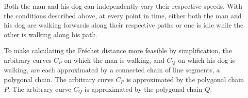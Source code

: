 Both the man and his dog can independently vary their respective speeds. With the conditions described above, at every point in time, either both the man and his dog are walking forwards along their respective paths or one is idle while the other is walking along his path.

To make calculating the Fréchet distance more feasible by simplification, the arbitrary curves $C_P$ on which the man is walking, and $C_Q$ on which his dog is walking, are each approximated by a connected chain of line segments, a polygonal chain. The arbitrary curve $C_P$ is approximated by the polygonal chain $P$. The arbitrary curve $C_Q$ is approximated by the polygonal chain $Q$.